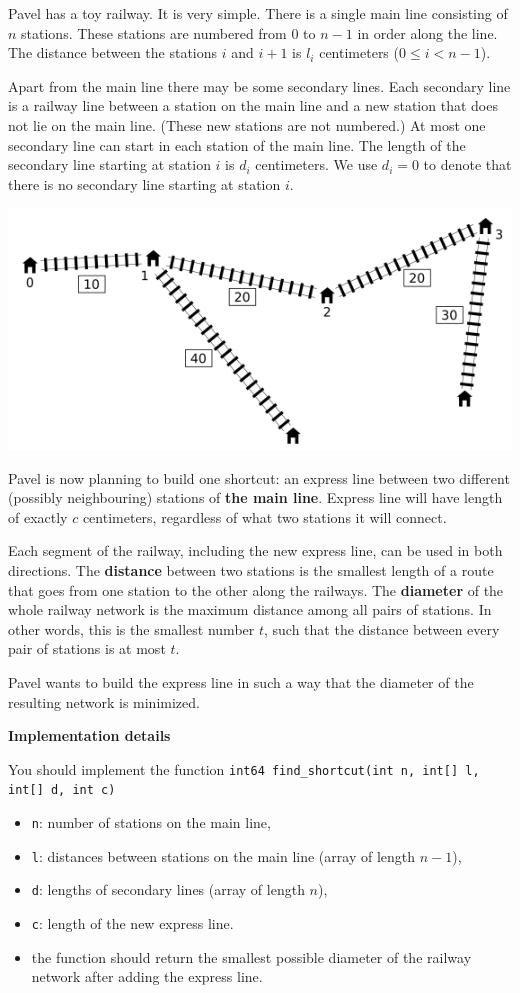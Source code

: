 Pavel has a toy railway. It is very simple. There is a single main line consisting of $n$ stations. These stations are numbered from $0$ to $n - 1$ in order along the line. The distance between the stations $i$ and $i + 1$ is $l_i$ centimeters ($0 \leq i < n - 1$).

Apart from the main line there may be some secondary lines. Each secondary line is a railway line between a station on the main line and a new station that does not lie on the main line. (These new stations are not numbered.) At most one secondary line can start in each station of the main line. The length of the secondary line starting at station $i$ is $d_i$ centimeters. We use $d_i = 0$ to denote that there is no secondary line starting at station $i$.

\includegraphics[scale=0.9]{1.png}

Pavel is now planning to build one shortcut: an express line between two different (possibly neighbouring) stations of \textbf{the main line}. Express line will have length of exactly $c$ centimeters, regardless of what two stations it will connect.

Each segment of the railway, including the new express line, can be used in both directions. The \textbf{distance} between two stations is the smallest length of a route that goes from one station to the other along the railways. The \textbf{diameter} of the whole railway network is the maximum distance among all pairs of stations. In other words, this is the smallest number $t$, such that the distance between every pair of stations is at most $t$.

Pavel wants to build the express line in such a way that the diameter of the resulting network is minimized.

\textbf{Implementation details}

You should implement the function
\texttt{int64 find\_shortcut(int n, int[] l, int[] d, int c) }

\begin{itemize}
\item \texttt{n}: number of stations on the main line,
\item \texttt{l}: distances between stations on the main line (array of length $n - 1$),  
\item \texttt{d}: lengths of secondary lines (array of length $n$),
\item \texttt{c}: length of the new express line.
\item the function should return the smallest possible diameter of the railway network after adding the express line.
\end{itemize}



